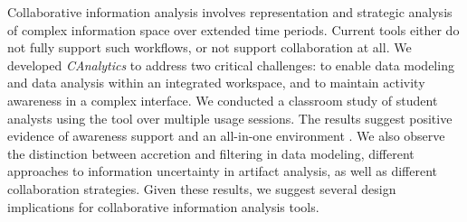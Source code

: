 
Collaborative information analysis involves representation and strategic analysis of complex information space over extended time periods. Current tools either do not fully support such workflows, or not support collaboration at all. We developed \emph{CAnalytics} to address two critical challenges: to enable data modeling and data analysis within an integrated workspace, and to maintain activity awareness in a complex interface. We conducted a classroom study of student analysts using the tool over multiple usage sessions. The results suggest positive evidence of awareness support and an all-in-one environment . We also observe the distinction between accretion and filtering in data modeling, different approaches to information uncertainty in artifact analysis, as well as different collaboration strategies. Given these results, we suggest several design implications for collaborative information analysis tools.
